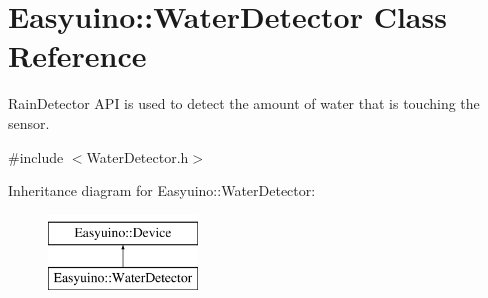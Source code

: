 \hypertarget{class_easyuino_1_1_water_detector}{}\section{Easyuino\+:\+:Water\+Detector Class Reference}
\label{class_easyuino_1_1_water_detector}


Rain\+Detector A\+PI is used to detect the amount of water that is touching the sensor.  




{\ttfamily \#include $<$Water\+Detector.\+h$>$}

Inheritance diagram for Easyuino\+:\+:Water\+Detector\+:\begin{figure}[H]
\begin{center}
\leavevmode
\includegraphics[height=2.000000cm]{class_easyuino_1_1_water_detector}
\end{center}
\end{figure}
